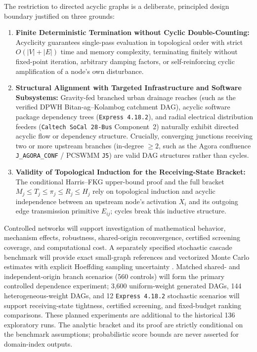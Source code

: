 The restriction to directed acyclic graphs is a deliberate, principled design
boundary justified on three grounds:
\begin{enumerate}[label=\arabic*.,leftmargin=*]
\item \textbf{Finite Deterministic Termination without Cyclic
Double-Counting:} Acyclicity guarantees single-pass evaluation in topological
order with strict $O(|V|+|E|)$ time and memory complexity, terminating
finitely without fixed-point iteration, arbitrary damping factors, or
self-reinforcing cyclic amplification of a node's own disturbance.
\item \textbf{Structural Alignment with Targeted Infrastructure and Software
Subsystems:} Gravity-fed branched urban drainage reaches (such as the
verified DPWH Bitan-ag--Kolambog catchment DAG), acyclic software package
dependency trees (\texttt{Express 4.18.2}), and radial electrical
distribution feeders (\texttt{Caltech SoCal 28-Bus} Component~2) naturally
exhibit directed acyclic flow or dependency structure. Crucially, converging
junctions receiving two or more upstream branches (in-degree $\ge 2$, such as
the Agora confluence \texttt{J\_AGORA\_CONF} / PCSWMM \texttt{J5}) are valid
DAG structures rather than cycles.
\item \textbf{Validity of Topological Induction for the Receiving-State
Bracket:} The conditional Harris--FKG upper-bound proof and the full bracket
$M_j \le T_j \le \pi_j \le R_j \le H_j$ rely on topological induction and
acyclic independence between an upstream node's activation $X_i$ and its
outgoing edge transmission primitive $E_{ij}$; cycles break this inductive
structure.
\end{enumerate}

Controlled networks will support investigation of mathematical behavior,
mechanism effects, robustness, shared-origin reconvergence, certified
screening coverage, and computational cost. A separately specified stochastic
cascade benchmark will provide exact small-graph references and vectorized
Monte Carlo estimates with explicit Hoeffding sampling uncertainty
\citep{hoeffding1963}. Matched shared- and independent-origin branch
scenarios (560 controls) will form the primary controlled dependence
experiment; 3,600 uniform-weight generated DAGs, 144 heterogeneous-weight
DAGs, and 12 \texttt{Express 4.18.2} stochastic scenarios will support
receiving-state tightness, certified screening, and fixed-budget ranking
comparisons. These planned experiments are additional to the historical 136
exploratory runs. The analytic bracket and its proof are strictly conditional
on the benchmark assumptions; probabilistic score bounds are never asserted
for domain-index outputs.

